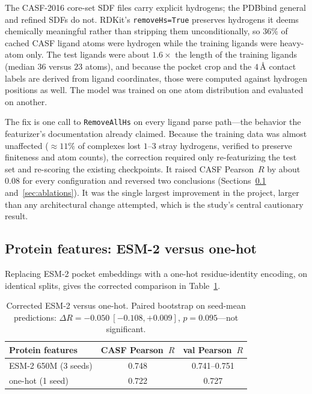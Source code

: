 \documentclass[11pt]{article}
\newcommand{\code}[1]{\texttt{#1}}
\newcommand{\Ang}{\mbox{\AA}}  %
\newcommand{\pearson}{Pearson~$R$}
\begin{document}
The CASF-2016 core-set SDF files carry explicit hydrogens; the PDBbind general and refined
SDFs do not. RDKit's \code{removeHs=True} preserves hydrogens it deems chemically
meaningful rather than stripping them unconditionally, so $36\%$ of cached CASF ligand
atoms were hydrogen while the training ligands were heavy-atom only. The test ligands were
about $1.6\times$ the length of the training ligands (median $36$ versus $23$ atoms), and
because the pocket crop and the $4\,\Ang$ contact labels are derived from ligand
coordinates, those were computed against hydrogen positions as well. The model was trained
on one atom distribution and evaluated on another.

The fix is one call to \code{RemoveAllHs} on every ligand parse path---the behavior the
featurizer's documentation already claimed. Because the training data was almost unaffected
($\approx11\%$ of complexes lost $1$--$3$ stray hydrogens, verified to preserve finiteness
and atom counts), the correction required only re-featurizing the test set and re-scoring
the existing checkpoints. It raised CASF \pearson{} by about $0.08$ for every
configuration and reversed two conclusions (Sections~\ref{sec:esm} and~\ref{sec:ablations}).
It was the single largest improvement in the project, larger than any architectural change
attempted, which is the study's central cautionary result.

\subsection{Protein features: ESM-2 versus one-hot}
\label{sec:esm}

Replacing ESM-2 pocket embeddings with a one-hot residue-identity encoding, on identical
splits, gives the corrected comparison in Table~\ref{tab:esm}.

\begin{table}[t]
\centering
\begin{tabular}{lcc}
\toprule
Protein features & CASF \pearson{} & val \pearson{} \\
\midrule
ESM-2 650M (3 seeds) & 0.748 & 0.741--0.751 \\
one-hot (1 seed)     & 0.722 & 0.727 \\
\bottomrule
\end{tabular}
\caption{Corrected ESM-2 versus one-hot. Paired bootstrap on seed-mean predictions:
$\Delta R = -0.050\ [-0.108, +0.009]$, $p=0.095$---not significant.}
\label{tab:esm}
\end{table}
\end{document}
